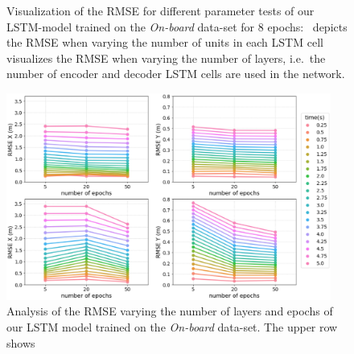 \begin{figure}[t!]
	\centering
    \vspace{-0.3cm}
    \caption{Visualization of the \ac{RMSE} for different parameter tests of our \ac{LSTM}-model trained on the \emph{On-board} data-set for \num{8} epochs:~\protect{} depicts the \ac{RMSE} when varying the number of units in each \ac{LSTM} cell~\protect{} visualizes the \ac{RMSE} when varying the number of layers, i.e.\ the number of encoder and decoder \ac{LSTM} cells are used in the network.}
    \label{fig:ngsim_dataset}
\end{figure}

\begin{figure}[t!]
  \centering
  \includegraphics[width=0.95\textwidth]{imgs/lstm_layers_epochs_analysis.eps}
  \caption{Analysis of the \ac{RMSE} varying the number of layers and epochs of our \ac{LSTM} model trained on the \emph{On-board} data-set. The upper row shows }\label{fig:lstm_input_data_analysis}
\end{figure}


